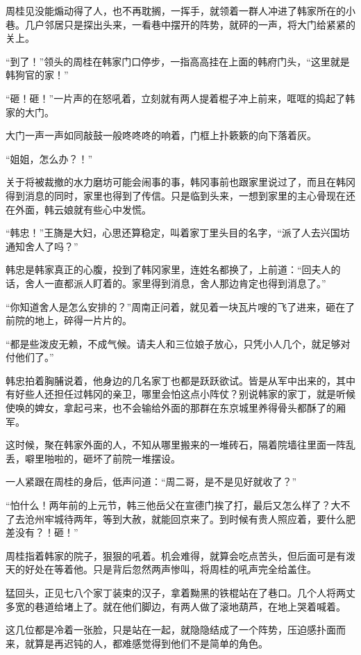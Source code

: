 周桂见没能煽动得了人，也不再耽搁，一挥手，就领着一群人冲进了韩家所在的小巷。几户邻居只是探出头来，一看巷中摆开的阵势，就砰的一声，将大门给紧紧的关上。

“到了！”领头的周桂在韩家门口停步，一指高高挂在上面的韩府门头，“这里就是韩狗官的家！”

“砸！砸！”一片声的在怒吼着，立刻就有两人提着棍子冲上前来，哐哐的捣起了韩家的大门。

大门一声一声如同敲鼓一般咚咚咚的响着，门框上扑簌簌的向下落着灰。

“姐姐，怎么办？！”

关于将被裁撤的水力磨坊可能会闹事的事，韩冈事前也跟家里说过了，而且在韩冈得到消息的同时，家里也得到了传信。只是临到头来，一想到家里的主心骨现在还在外面，韩云娘就有些心中发慌。

“韩忠！”王旖是大妇，心思还算稳定，叫着家丁里头目的名字，“派了人去兴国坊通知舍人了吗？”

韩忠是韩家真正的心腹，投到了韩冈家里，连姓名都换了，上前道：“回夫人的话，舍人一直都派人盯着的。家里得到消息，舍人那边肯定也得到消息了。”

“你知道舍人是怎么安排的？”周南正问着，就见着一块瓦片嗖的飞了进来，砸在了前院的地上，碎得一片片的。

“都是些泼皮无赖，不成气候。请夫人和三位娘子放心，只凭小人几个，就足够对付他们了。”

韩忠拍着胸脯说着，他身边的几名家丁也都是跃跃欲试。皆是从军中出来的，其中有好些人还担任过韩冈的亲卫，哪里会怕这点小阵仗？别说韩家的家丁，就是听候使唤的婢女，拿起弓来，也不会输给外面的那群在东京城里养得骨头都酥了的厢军。

这时候，聚在韩家外面的人，不知从哪里搬来的一堆砖石，隔着院墙往里面一阵乱丢，噼里啪啦的，砸坏了前院一堆摆设。

一人紧跟在周桂的身后，低声问道：“周二哥，是不是见好就收了？”

“怕什么！两年前的上元节，韩三他岳父在宣德门挨了打，最后又怎么样了？大不了去沧州牢城待两年，等到大赦，就能回京来了。到时候有贵人照应着，要什么肥差没有？！砸！”

周桂指着韩家的院子，狠狠的吼着。机会难得，就算会吃点苦头，但后面可是有泼天的好处在等着他。只是背后忽然两声惨叫，将周桂的吼声完全给盖住。

猛回头，正见七八个家丁装束的汉子，拿着黝黑的铁棍站在了巷口。几个人将两丈多宽的巷道给堵上了。就在他们脚边，有两人做了滚地葫芦，在地上哭着喊着。

这几位都是冷着一张脸，只是站在一起，就隐隐结成了一个阵势，压迫感扑面而来，就算是再迟钝的人，都难感觉得到他们不是简单的角色。

